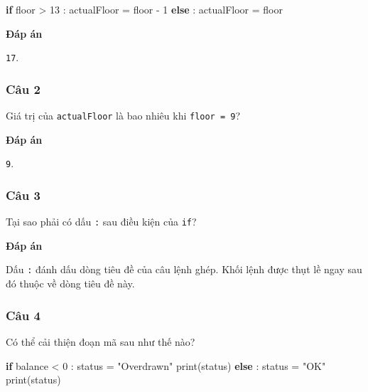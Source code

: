 \documentclass[
  11pt,
  a4paper,
]{article}
\newenvironment{Shaded}{}{}
\newcommand{\BuiltInTok}[1]{\textcolor[rgb]{0.00,0.50,0.00}{#1}}
\newcommand{\ControlFlowTok}[1]{\textcolor[rgb]{0.00,0.44,0.13}{\textbf{#1}}}
\newcommand{\DecValTok}[1]{\textcolor[rgb]{0.25,0.63,0.44}{#1}}
\newcommand{\NormalTok}[1]{#1}
\newcommand{\OperatorTok}[1]{\textcolor[rgb]{0.40,0.40,0.40}{#1}}
\newcommand{\StringTok}[1]{\textcolor[rgb]{0.25,0.44,0.63}{#1}}
\begin{document}
\begin{Shaded}
\begin{Highlighting}[]
\ControlFlowTok{if}\NormalTok{ floor }\OperatorTok{\textgreater{}} \DecValTok{13}\NormalTok{ :}
\NormalTok{    actualFloor }\OperatorTok{=}\NormalTok{ floor }\OperatorTok{{-}} \DecValTok{1}
\ControlFlowTok{else}\NormalTok{ :}
\NormalTok{    actualFloor }\OperatorTok{=}\NormalTok{ floor}
\end{Highlighting}
\end{Shaded}

\textbf{Đáp án}

\texttt{17}.

\subsubsection{Câu 2}\label{cuxe2u-2}

Giá trị của \texttt{actualFloor} là bao nhiêu khi \texttt{floor\ =\ 9}?

\textbf{Đáp án}

\texttt{9}.

\subsubsection{Câu 3}\label{cuxe2u-3}

Tại sao phải có dấu \texttt{:} sau điều kiện của \texttt{if}?

\textbf{Đáp án}

Dấu \texttt{:} đánh dấu dòng tiêu đề của câu lệnh ghép. Khối lệnh được
thụt lề ngay sau đó thuộc về dòng tiêu đề này.

\subsubsection{Câu 4}\label{cuxe2u-4}

Có thể cải thiện đoạn mã sau như thế nào?

\begin{Shaded}
\begin{Highlighting}[]
\ControlFlowTok{if}\NormalTok{ balance }\OperatorTok{\textless{}} \DecValTok{0}\NormalTok{ :}
\NormalTok{    status }\OperatorTok{=} \StringTok{"Overdrawn"}
    \BuiltInTok{print}\NormalTok{(status)}
\ControlFlowTok{else}\NormalTok{ :}
\NormalTok{    status }\OperatorTok{=} \StringTok{"OK"}
    \BuiltInTok{print}\NormalTok{(status)}
\end{Highlighting}
\end{Shaded}
\end{document}
